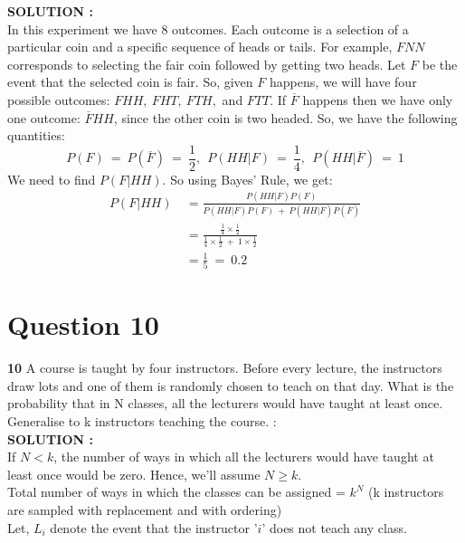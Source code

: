 \documentclass{article}
\begin{document}
\hspace{1em} \large{\textbf{SOLUTION :}} \\
In this experiment we have 8 outcomes. Each outcome is a selection of a particular coin and a specific sequence of heads or tails. For example, $FNN$ corresponds to selecting the fair coin followed by getting two heads. Let $F$ be the event that the selected coin is fair. So, given $F$ happens, we will have four possible outcomes: $FHH,\ FHT,\ FTH,$ and $FTT$. If $\overline{F}$ happens then we have only one outcome: $\overline{F}HH$, since the other coin is two headed. So, we have the following quantities:
\begin{equation*}
    P(F)\ =\ P(\overline{F})\ =\ \frac{1}{2},\ \ P(HH|F)\ =\ \frac{1}{4},\ \ P(HH|\overline{F})\ =\ 1  
\end{equation*}
We need to find $P(F|HH)$. So using Bayes' Rule, we get:
\begin{equation*}
    \begin{split}
        P(F|HH)\ &= \frac{P(HH|F)P(F)}{P(HH|F)P(F)\ +\ P(HH|\overline{F})P(\overline{F})} \\
                 &= \frac{   \frac{1}{4} \times  \frac{1}{2}   }{   \frac{1}{4} \times  \frac{1}{2}\ +\ 1 \times  \frac{1}{2}    }\\
                 &= \frac{1}{5}\ =\ 0.2
    \end{split}
\end{equation*}

\section{Question 10}
\label{Q10}
\textbf{10} A course is taught by four instructors. Before every lecture, the instructors draw lots and one of them is randomly chosen to teach on that day. What is the probability that in N classes, all the lecturers would have taught at least once. Generalise to k instructors teaching the course. : \\

\hspace{1em} \large{\textbf{SOLUTION :}} \\
    If $N < k$, the number of ways in which all the lecturers would have taught at least once would be zero. Hence, we’ll assume $N \geq k$. \\
Total number of ways in which the classes can be assigned = $k^N$ (k instructors are sampled with replacement and with ordering) \\
Let, $L_i$ denote the event that the instructor '$i$' does not teach any class. \\
\end{document}

